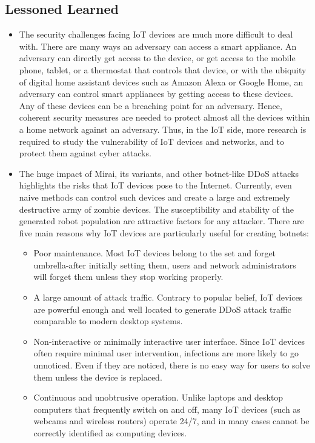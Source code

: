 \documentclass[conference]{IEEEtran}
\begin{document}
\subsection{\textbf{Lessoned Learned }}
\begin{itemize}
\item{The security challenges facing IoT devices are much
more difficult to deal with. There are many ways an adversary
can access a smart appliance. An adversary can
directly get access to the device, or get access to the mobile
phone, tablet, or a thermostat that controls that device,
or with the ubiquity of digital home assistant devices
such as Amazon Alexa or Google Home, an adversary
can control smart appliances by getting access to
these devices. Any of these devices can be a breaching
point for an adversary. Hence, coherent security measures
are needed to protect almost all the devices within
a home network against an adversary.
Thus, in the IoT side, more research is required to study
the vulnerability of IoT devices and networks, and to protect
them against cyber attacks.\cite{b11}}
\item{The huge impact of Mirai, its variants, and other botnet-like DDoS attacks highlights the risks that IoT devices pose to the Internet. Currently, even naive methods can control such devices and create a large and extremely destructive army of zombie devices. The susceptibility and stability of the generated robot population are attractive factors for any attacker. There are five main reasons why IoT devices are particularly useful for creating botnets: \cite{b8}}
\begin{itemize}
\item{Poor maintenance. Most IoT devices belong to the set and forget umbrella-after initially setting them, users and network administrators will forget them unless they stop working properly.}
\item{A large amount of attack traffic. Contrary to popular belief, IoT devices are powerful enough and well located to generate DDoS attack traffic comparable to modern desktop systems.}
\item{Non-interactive or minimally interactive user interface. Since IoT devices often require minimal user intervention, infections are more likely to go unnoticed. Even if they are noticed, there is no easy way for users to solve them unless the device is replaced.}
\item{Continuous and unobtrusive operation. Unlike laptops and desktop computers that frequently switch on and off, many IoT devices (such as webcams and wireless routers) operate 24/7, and in many cases cannot be correctly identified as computing devices.}

\end{itemize}
\end{itemize}
\end{document}
